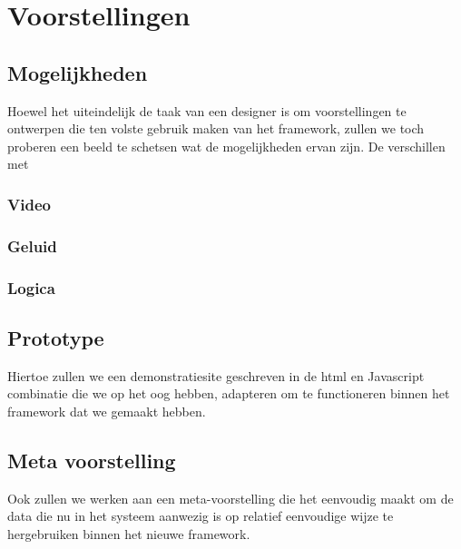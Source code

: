 \part{Voorstellingen}
\label{voorstellingen}

\chapter{Mogelijkheden}

Hoewel het uiteindelijk de taak van een designer is om voorstellingen te ontwerpen die ten volste gebruik maken van het framework, zullen we toch proberen een beeld te schetsen wat de mogelijkheden ervan zijn. De verschillen met

\section{Video}

\section{Geluid} 

\section{Logica}


\chapter{Prototype}
Hiertoe zullen we een demonstratiesite geschreven in de \ac{html} en Javascript combinatie die we op het oog hebben, adapteren om te functioneren binnen het framework dat we gemaakt hebben.


\chapter{Meta voorstelling}

Ook zullen we werken aan een meta-voorstelling die het eenvoudig maakt om de data die nu in het systeem aanwezig is op relatief eenvoudige wijze te hergebruiken binnen het nieuwe framework.

